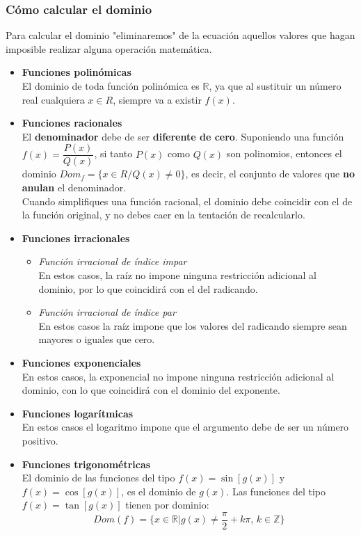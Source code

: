 \subsubsection{Cómo calcular el dominio}
Para calcular el dominio "eliminaremos" de la ecuación aquellos valores que hagan imposible realizar alguna operación matemática.
\begin{itemize}
	\item \textbf{Funciones polinómicas}\\
	El dominio de toda función polinómica es $\mathbb{R}$, ya que al sustituir un número real cualquiera $x \in R$, siempre va a existir $f(x)$.
	\item \textbf{Funciones racionales}\\
	El \textbf{denominador} debe de ser \textbf{diferente de cero}. Suponiendo una función $f(x) = \dfrac{P(x)}{Q(x)}$, si tanto $P(x)$ como $Q(x)$ son polinomios, entonces el dominio $Dom_{f}= \{x \in R / Q(x) \neq 0\}$, es decir, el conjunto de valores que \textbf{no anulan} el denominador.\\
	Cuando simplifiques una función racional, el dominio debe coincidir con el de la función original, y no debes caer en la tentación de recalcularlo.
	\item \textbf{Funciones irracionales}\\
	\begin{itemize}
		\item \emph{Función irracional de índice impar}\\
		En estos casos, la raíz no impone ninguna restricción adicional al dominio, por lo que coincidirá con el del radicando.
		\item \emph{Función irracional de índice par}\\
		En estos casos la raíz impone que los valores del radicando siempre sean mayores o iguales que cero.
	\end{itemize}
	\item \textbf{Funciones exponenciales}\\
	En estos casos, la exponencial no impone ninguna restricción adicional al dominio, con lo que coincidirá con el dominio del exponente.
	\item \textbf{Funciones logarítmicas}\\
	En estos casos el logaritmo impone que el argumento debe de ser un número positivo.
	\item \textbf{Funciones trigonométricas}\\
	El dominio de las funciones del tipo $f(x)=\sin[g(x)]$ y $f(x)=\cos[g(x)]$, es el dominio de $g(x)$. Las funciones del tipo $f(x)=\tan[g(x)]$ tienen por dominio:
	$$Dom(f)=\{x \in \mathbb{R} | g(x) \neq \dfrac{\pi}{2} + k\pi \text{, } k \in \mathbb{Z}\}$$	
\end{itemize}

